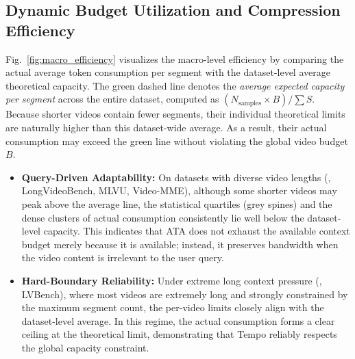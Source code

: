 \subsection{Dynamic Budget Utilization and Compression Efficiency}

Fig.~\ref{fig:macro_efficiency} visualizes the macro-level efficiency by comparing the actual average token consumption per segment with the dataset-level average theoretical capacity. 
%
The green dashed line denotes the \emph{average expected capacity per segment} across the entire dataset, computed as $(N_{\text{samples}} \times B) / \sum S$. Because shorter videos contain fewer segments, their individual theoretical limits are naturally higher than this dataset-wide average. As a result, their actual consumption may exceed the green line without violating the global video budget $B$.

\begin{itemize}
    \item \textbf{Query-Driven Adaptability:} 
    On datasets with diverse video lengths (\eg, LongVideoBench, MLVU, Video-MME), although some shorter videos may peak above the average line, the statistical quartiles (grey spines) and the dense clusters of actual consumption consistently lie well below the dataset-level capacity. This indicates that ATA does not exhaust the available context budget merely because it is available; instead, it preserves bandwidth when the video content is irrelevant to the user query.

    \item \textbf{Hard-Boundary Reliability:} 
    Under extreme long context pressure (\eg, LVBench), where most videos are extremely long and strongly constrained by the maximum segment count, the per-video limits closely align with the dataset-level average. In this regime, the actual consumption forms a clear ceiling at the theoretical limit, demonstrating that Tempo reliably respects the global capacity constraint.
\end{itemize}


